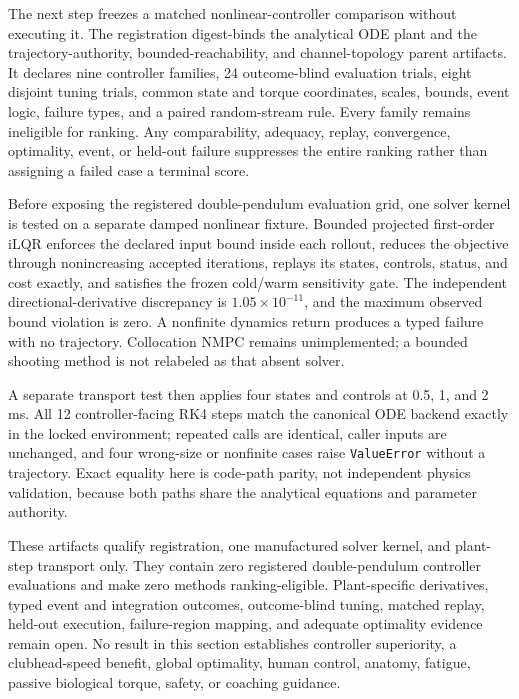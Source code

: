 \documentclass[
  letterpaper,
]{report}
\begin{document}
The next step freezes a matched nonlinear-controller comparison without
executing it. The registration digest-binds the analytical ODE plant and
the trajectory-authority, bounded-reachability, and channel-topology
parent artifacts. It declares nine controller families, 24 outcome-blind
evaluation trials, eight disjoint tuning trials, common state and torque
coordinates, scales, bounds, event logic, failure types, and a paired
random-stream rule. Every family remains ineligible for ranking. Any
comparability, adequacy, replay, convergence, optimality, event, or
held-out failure suppresses the entire ranking rather than assigning a
failed case a terminal score.

Before exposing the registered double-pendulum evaluation grid, one
solver kernel is tested on a separate damped nonlinear fixture. Bounded
projected first-order iLQR enforces the declared input bound inside each
rollout, reduces the objective through nonincreasing accepted
iterations, replays its states, controls, status, and cost exactly, and
satisfies the frozen cold/warm sensitivity gate. The independent
directional-derivative discrepancy is \(1.05\times10^{-11}\), and the
maximum observed bound violation is zero. A nonfinite dynamics return
produces a typed failure with no trajectory. Collocation NMPC remains
unimplemented; a bounded shooting method is not relabeled as that absent
solver.

A separate transport test then applies four states and controls at 0.5,
1, and 2 ms. All 12 controller-facing RK4 steps match the canonical ODE
backend exactly in the locked environment; repeated calls are identical,
caller inputs are unchanged, and four wrong-size or nonfinite cases
raise \texttt{ValueError} without a trajectory. Exact equality here is
code-path parity, not independent physics validation, because both paths
share the analytical equations and parameter authority.

These artifacts qualify registration, one manufactured solver kernel,
and plant-step transport only. They contain zero registered
double-pendulum controller evaluations and make zero methods
ranking-eligible. Plant-specific derivatives, typed event and
integration outcomes, outcome-blind tuning, matched replay, held-out
execution, failure-region mapping, and adequate optimality evidence
remain open. No result in this section establishes controller
superiority, a clubhead-speed benefit, global optimality, human control,
anatomy, fatigue, passive biological torque, safety, or coaching
guidance.
\end{document}
